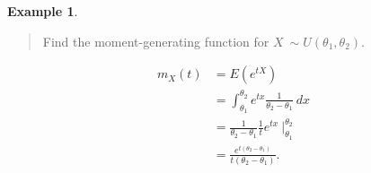\documentclass[
]{book}
\theoremstyle{definition}
\theoremstyle{definition}
\newtheorem{example}{Example}[chapter]
\theoremstyle{definition}
\theoremstyle{definition}
\theoremstyle{remark}
\begin{document}
\begin{example}
\leavevmode

\begin{quote}
Find the moment-generating function for \(X ~\sim U(\theta_1, \theta_2)\).
\end{quote}

\begin{align*}
m_X(t) &= E(e^{tX})\\
        &= \int_{\theta_1}^{\theta_2} e^{tx}\frac{1}{\theta_2-\theta_1}~dx\\
        &= \frac{1}{\theta_2-\theta_1} \frac{1}{t}e^{tx}~\biggr|_{\theta_1}^{\theta_2} \\
        &= \frac{e^{t(\theta_2-\theta_1)}}{t(\theta_2-\theta_1)}.
\end{align*}

\end{example}
\end{document}
